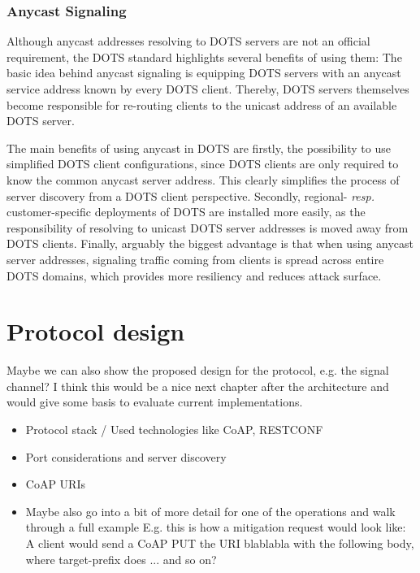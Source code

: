 \subsubsection{Anycast Signaling}
Although anycast addresses resolving to DOTS servers are not an official requirement, the DOTS standard highlights several benefits of using them: The basic idea behind anycast signaling is equipping DOTS servers with an anycast service address known by every DOTS client. Thereby, DOTS servers themselves become responsible for re-routing clients to the unicast address of an available DOTS server. 

The main benefits of using anycast in DOTS are firstly, the possibility to use simplified DOTS client configurations, since DOTS clients are only required to know the common anycast server address. This clearly simplifies the process of server discovery from a DOTS client perspective. Secondly, regional- \emph{resp.} customer-specific deployments of DOTS are installed more easily, as the responsibility of resolving to unicast DOTS server addresses is moved away from DOTS clients. Finally, arguably the biggest advantage is that when using anycast server addresses, signaling traffic coming from clients is spread across entire DOTS domains, which provides more resiliency and reduces attack surface.

\iffalse
\section{Protocol design}
Maybe we can also show the proposed design for the protocol, e.g. the signal channel? I think this would be a nice next chapter after the architecture and would give some basis to evaluate current implementations.

\begin{itemize}
    \item Protocol stack / Used technologies like CoAP, RESTCONF
    \item Port considerations and server discovery
    \item CoAP URIs
    \item Maybe also go into a bit of more detail for one of the operations and walk through a full example E.g. this is how a mitigation request would look like:
A client would send a CoAP PUT the URI blablabla with the following body, where target-prefix does ... and so on?
\end{itemize} 


